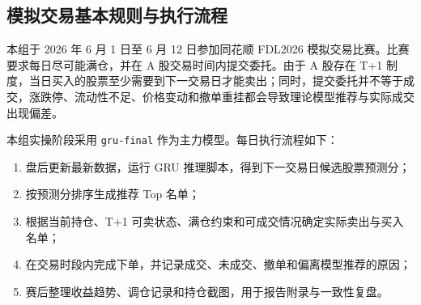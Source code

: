 \documentclass[12pt,a4paper,cn,bibtex]{elegantpaper}
\newcommand{\modelname}[1]{\nolinkurl{#1}}
\begin{document}
\subsection{模拟交易基本规则与执行流程}
本组于 2026 年 6 月 1 日至 6 月 12 日参加同花顺 FDL2026 模拟交易比赛。比赛要求每日尽可能满仓，并在 A 股交易时间内提交委托。由于 A 股存在 T+1 制度，当日买入的股票至少需要到下一交易日才能卖出；同时，提交委托并不等于成交，涨跌停、流动性不足、价格变动和撤单重挂都会导致理论模型推荐与实际成交出现偏差。

本组实操阶段采用 \modelname{gru-final} 作为主力模型。每日执行流程如下：
\begin{enumerate}[label=\arabic*)]
    \item 盘后更新最新数据，运行 GRU 推理脚本，得到下一交易日候选股票预测分；
    \item 按预测分排序生成推荐 Top 名单；
    \item 根据当前持仓、T+1 可卖状态、满仓约束和可成交情况确定实际卖出与买入名单；
    \item 在交易时段内完成下单，并记录成交、未成交、撤单和偏离模型推荐的原因；
    \item 赛后整理收益趋势、调仓记录和持仓截图，用于报告附录与一致性复盘。
\end{enumerate}
\end{document}
